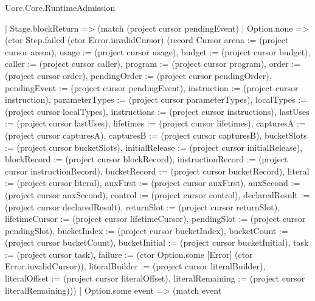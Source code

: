 \begin{lexlean}{Uorc.Core.RuntimeAdmission}
\begin{semanticmodule}
{      | Stage.blockReturn => (match (project cursor pendingEvent)
        | Option.none => (ctor Step.failed (ctor Error.invalidCursor) (record Cursor {arena := (project cursor arena), usage := (project cursor usage), budget := (project cursor budget), caller := (project cursor caller), program := (project cursor program), order := (project cursor order), pendingOrder := (project cursor pendingOrder), pendingEvent := (project cursor pendingEvent), instruction := (project cursor instruction), parameterTypes := (project cursor parameterTypes), localTypes := (project cursor localTypes), instructions := (project cursor instructions), lastUses := (project cursor lastUses), lifetimes := (project cursor lifetimes), capturesA := (project cursor capturesA), capturesB := (project cursor capturesB), bucketSlots := (project cursor bucketSlots), initialRelease := (project cursor initialRelease), blockRecord := (project cursor blockRecord), instructionRecord := (project cursor instructionRecord), bucketRecord := (project cursor bucketRecord), literal := (project cursor literal), auxFirst := (project cursor auxFirst), auxSecond := (project cursor auxSecond), control := (project cursor control), declaredResult := (project cursor declaredResult), returnSlot := (project cursor returnSlot), lifetimeCursor := (project cursor lifetimeCursor), pendingSlot := (project cursor pendingSlot), bucketIndex := (project cursor bucketIndex), bucketCount := (project cursor bucketCount), bucketInitial := (project cursor bucketInitial), task := (project cursor task), failure := (ctor Option.some [Error] (ctor Error.invalidCursor)), literalBuilder := (project cursor literalBuilder), literalOffset := (project cursor literalOffset), literalRemaining := (project cursor literalRemaining)}))
        | Option.some event => (match event
}
\end{semanticmodule}
\end{lexlean}
